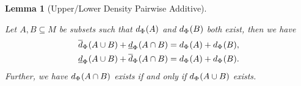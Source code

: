 \documentclass[
  british,
]{article}
\theoremstyle{definition}
\theoremstyle{plain}
\theoremstyle{plain}
\newtheorem{lemma}{Lemma}[section]
\theoremstyle{remark}
\newcommand{\Folner}[1][\vphantom{}]{{\Phi}_{#1}}
\newcommand{\Monoid}{{M}}
\newcommand{\Density}[2][\Folner]{d_{{#1}}({#2})}
\newcommand{\LowerDensity}[2][\Folner]{\underline{d}_{{#1}}({#2})}
\newcommand{\UpperDensity}[2][\Folner]{\overline{d}_{{#1}}({#2})}
\begin{document}
\begin{lemma}[Upper/Lower Density Pairwise
Additive]\protect\hypertarget{lem-DensityPairwiseAdditivity}{}\label{lem-DensityPairwiseAdditivity}

Let \(A,B\subseteq\Monoid\) be subsets such that \(\Density{A}\) and
\(\Density{B}\) both exist, then we have \begin{align*}
    \UpperDensity{A\cup B}+\LowerDensity{A\cap B}&=\Density{A}+\Density{B},
    \\\LowerDensity{A\cup B}+\UpperDensity{A\cap B}&=\Density{A}+\Density{B}.
\end{align*} Further, we have \(\Density{A\cap B}\) exists if and only
if \(\Density{A\cup B}\) exists.

\end{lemma}
\end{document}
